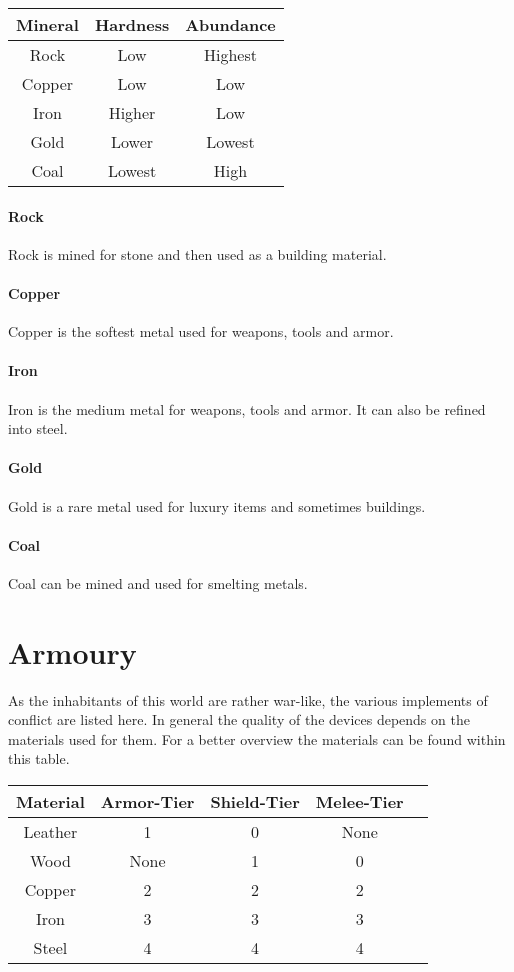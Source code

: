 \documentclass[a4paper]{book}
\begin{document}
\begin{longtable}{ccc}
	\toprule
	Mineral & Hardness & Abundance \\
	\midrule
	Rock & Low & Highest \\
	Copper & Low & Low \\
	Iron & Higher & Low \\
	Gold & Lower & Lowest \\
	Coal & Lowest & High \\
	\bottomrule
\end{longtable}

\paragraph{Rock}
Rock is mined for stone and then used as a building material.

\paragraph{Copper}
Copper is the softest metal used for weapons, tools and armor.

\paragraph{Iron}
Iron is the medium metal for weapons, tools and armor.
It can also be refined into steel.

\paragraph{Gold}
Gold is a rare metal used for luxury items and sometimes buildings.

\paragraph{Coal}
Coal can be mined and used for smelting metals.

\section{Armoury}
As the inhabitants of this world are rather war-like,
the various implements of conflict are listed here.
In general the quality of the devices depends on the materials used for them.
For a better overview the materials can be found within this table.

\begin{longtable}{ccccc}
	\toprule
	Material & Armor-Tier & Shield-Tier & Melee-Tier \\
	\midrule
	Leather & 1 & 0 & None \\
	Wood & None & 1 & 0 \\
	Copper & 2 & 2 & 2 \\
	Iron & 3 & 3 & 3 \\
	Steel & 4 & 4 & 4 \\
	\bottomrule
\end{longtable}
\end{document}
